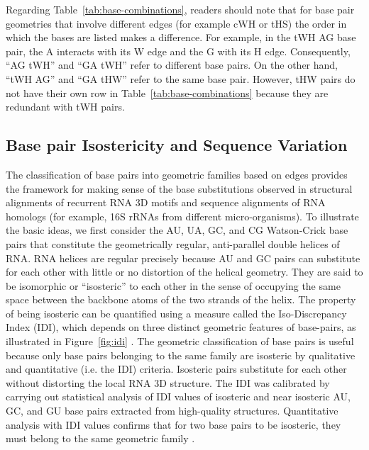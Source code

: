 Regarding Table~\ref{tab:base-combinations}, readers should note that for base pair geometries that
involve different edges (for example cWH or tHS) the order in which the bases
are listed makes a difference. For example, in the tWH AG base pair, the A
interacts with its W edge and the G with its H edge. Consequently, ``AG tWH''
and ``GA tWH'' refer to different base pairs. On the other hand, ``tWH AG'' and
``GA tHW'' refer to the same base pair. However, tHW pairs do not have their own
row in Table~\ref{tab:base-combinations} because they are redundant with tWH pairs. 

\subsection{Base pair Isostericity and Sequence Variation}

The classification of base pairs into geometric families based on edges provides
the framework for making sense of the base substitutions observed in structural
alignments of recurrent RNA 3D motifs and sequence alignments of RNA homologs
(for example, 16S rRNAs from different micro-organisms). To illustrate the basic
ideas, we first consider the AU, UA, GC, and CG Watson-Crick base pairs that
constitute the geometrically regular, anti-parallel double helices of RNA. RNA
helices are regular precisely because AU and GC pairs can substitute for each
other with little or no distortion of the helical geometry. They are said to be
isomorphic or “isosteric” to each other in the sense of occupying the same space
between the backbone atoms of the two strands of the helix. The property of
being isosteric can be quantified using a measure called the Iso-Discrepancy
Index (IDI), which depends on three distinct geometric features of base-pairs,
as illustrated in Figure~\ref{fig:idi} \cite{Stombaugh2009}. The geometric classification
of base pairs is useful because only base pairs belonging to the same family are
isosteric by qualitative and quantitative (i.e. the IDI) criteria. Isosteric
pairs substitute for each other without distorting the local RNA 3D structure.
The IDI was calibrated by carrying out statistical analysis of IDI values of
isosteric and near isosteric AU, GC, and GU base pairs extracted from
high-quality structures. Quantitative analysis with IDI values confirms that for
two base pairs to be isosteric, they must belong to the same geometric family
\cite{Stombaugh2009}. 

